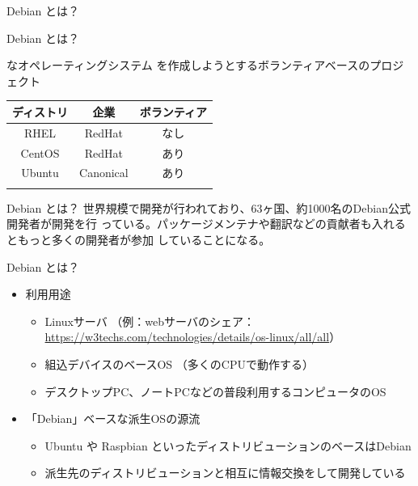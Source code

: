 \begin{frame}\begin{center}\Huge{Debian とは？}\end{center}\end{frame}


\begin{frame}{Debian とは？}

{\color{red}{フリー/オープン}}な{\color{red}{ユニバーサル}}オペレーティングシステム を作成しようとするボランティアベースのプロジェクト

\begin{table}[htb]
  \begin{tabular}{|c|c|c|}
    \hline
    ディストリ & 企業 & ボランティア \\ \hline
    RHEL & RedHat & なし  \\ \hline
    CentOS & RedHat & あり \\ \hline
    Ubuntu  & Canonical & あり \\ \hline
    \color{red}{Debian}  & \color{red}{なし} & \color{red}{あり} \\ \hline
  \end{tabular}
\end{table}

\end{frame}

\begin{frame}{Debian とは？}
 世界規模で開発が行われており、63ヶ国、約1000名のDebian公式開発者が開発を行
 っている。パッケージメンテナや翻訳などの貢献者も入れるともっと多くの開発者が参加
 していることになる。
 \begin{center}
 \end{center}
\end{frame}


\begin{frame}{Debian とは？}

\begin{itemize}
  \item 利用用途
  \begin{itemize}
    \item Linuxサーバ （例：webサーバのシェア：\url{https://w3techs.com/technologies/details/os-linux/all/all}）
    \item 組込デバイスのベースOS （多くのCPUで動作する）
    \item デスクトップPC、ノートPCなどの普段利用するコンピュータのOS
  \end{itemize}
  \item 「Debian」ベースな派生OSの源流
  \begin{itemize}
    \item Ubuntu や Raspbian といったディストリビューションのベースはDebian
    \item 派生先のディストリビューションと相互に情報交換をして開発している
  \end{itemize}
\end{itemize}

\end{frame}


